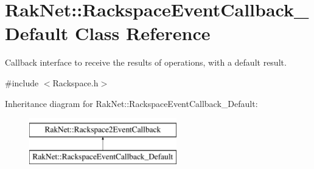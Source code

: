 \hypertarget{class_rak_net_1_1_rackspace_event_callback___default}{\section{Rak\-Net\-:\-:Rackspace\-Event\-Callback\-\_\-\-Default Class Reference}
\label{class_rak_net_1_1_rackspace_event_callback___default}
}


Callback interface to receive the results of operations, with a default result.  




{\ttfamily \#include $<$Rackspace.\-h$>$}

Inheritance diagram for Rak\-Net\-:\-:Rackspace\-Event\-Callback\-\_\-\-Default\-:\begin{figure}[H]
\begin{center}
\leavevmode
\includegraphics[height=2.000000cm]{class_rak_net_1_1_rackspace_event_callback___default}
\end{center}
\end{figure}
